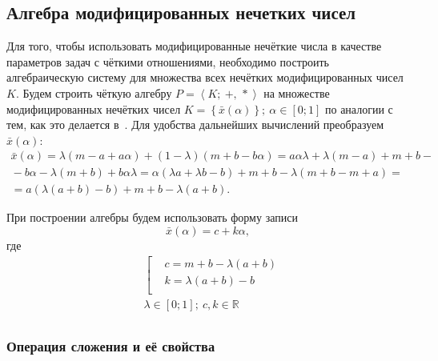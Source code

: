 \subsection{Алгебра модифицированных нечетких чисел}
Для того, чтобы использовать модифицированные нечёткие числа в качестве параметров задач с чёткими отношениями, необходимо построить алгебраическую систему для множества всех нечётких модифицированных чисел $K$. Будем строить чёткую алгебру $P=\left\langle K ;\ +,\,* \right\rangle$ на множестве модифицированных нечётких чисел $K=\left\{ \bar{x}\left( \alpha  \right) \right\};\ \alpha \in \left[ 0;1 \right]$ по аналогии с тем, как это делается в~\cite{Yakhyaeva}. Для удобства дальнейших вычислений преобразуем $\bar{x}\left( \alpha \right)$:
\begin{gather*}
  \bar{x}\left( \alpha  \right)=\lambda \left( m-a+a\alpha  \right)+\left( 1-\lambda  \right)\left( m+b-b\alpha  \right)=a\alpha \lambda +\lambda \left( m-a \right)+m+b-{}\\
  {}-b\alpha -\lambda \left( m+b \right)+b\alpha \lambda =\alpha \left( \lambda a+\lambda b-b \right)+m+b-\lambda \left( m+b-m+a \right)={}\\
  {}=a\left( \lambda \left( a+b \right)-b \right)+m+b-\lambda \left( a+b \right).
\end{gather*}

При построении алгебры будем использовать форму записи
\begin{equation}
\label{eq:modified-number-base}
  \bar{x}\left( \alpha  \right)=c+k\alpha,
\end{equation}
где
\begin{equation}
\label{eq:modified-number-from-abm}
  \begin{aligned}
    & \left[ \begin{aligned}
    & c=m+b-\lambda \left( a+b \right) \\ 
    & k=\lambda \left( a+b \right)-b \\ 
  \end{aligned} \right. \\ 
  & \lambda \in \left[ 0;1 \right];\ c,k\in \mathbb{R} \\ 
\end{aligned}
\end{equation}

\subsubsection*{Операция сложения и её свойства}

